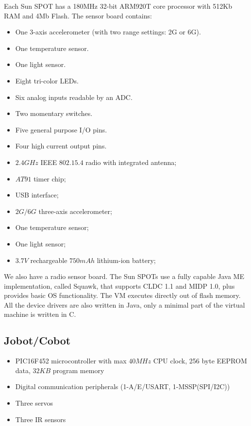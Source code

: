 \documentclass[a4paper,10pt]{article} %
\begin{document}
Each Sun SPOT has a 180MHz 32-bit ARM920T core processor with 512Kb RAM and 4Mb
Flash. The sensor board contains:

\begin{itemize}
    \item One 3-axis accelerometer (with two range settings: 2G or 6G).
    \item One temperature sensor.
    \item One light sensor.
    \item Eight tri-color LEDs.
    \item Six analog inputs readable by an ADC.
    \item Two momentary switches.
    \item Five general purpose I/O pins.
    \item Four high current output pins.
    \item $2.4 GHz$ IEEE $802.15.4$ radio with integrated antenna;
    \item $AT91$ timer chip;
    \item USB interface;
    \item $2G/6G$ three-axis accelerometer;
    \item One temperature sensor;
    \item One light sensor;
    \item $3.7V$ rechargeable $750 mAh$ lithium-ion battery;
\end{itemize}

We also have a radio sensor board. The Sun SPOTs use a fully capable Java ME
implementation, called Squawk, that supports CLDC 1.1 and MIDP 1.0, plus
provides basic OS functionality. The VM executes directly out of flash memory.
All the device drivers are also written in Java, only a minimal part of the
virtual machine is written in C.


\subsection{Jobot/Cobot} %
\label{app:cobot}

\begin{itemize}
    \item PIC16F452 microcontroller with max $40MHz$ CPU clock, 256 byte
    EEPROM data, $32KB$ program memory
    \item Digital communication peripherals (1-A/E/USART, 1-MSSP(SPI/I2C))
    \item Three servos
    \item Three IR sensors
\end{itemize}
\end{document}
